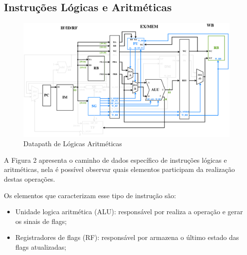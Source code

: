 \documentclass{report}
\begin{document}
\subsection{Instruções Lógicas e Aritméticas}
\begin{figure}[H]
\centering
\includegraphics[width=\textwidth]{./pictures/DatapathLA.pdf}
\caption{Datapath de Lógicas Aritméticas}
\end{figure}


A Figura 2 apresenta o caminho de dados específico de instruções lógicas e aritméticas, nela é possível observar quais elementos participam da realização destas operações.\newline

Os elementos que caracterizam esse tipo de instrução são: 
\begin{itemize}
    \item Unidade logica aritmética (ALU): responsável por realiza a operação e gerar os sinais de flags;
    \item Registradores de flags (RF): responsável por armazena o último estado das flags atualizadas;
\end{itemize}
 
\end{document}
